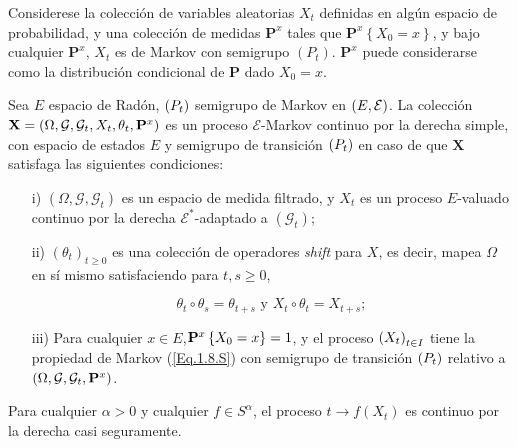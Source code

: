 Considerese la colecci\'on de variables aleatorias $X_{t}$ definidas en alg\'un espacio de probabilidad, y una colecci\'on de medidas $\mathbf{P}^{x}$ tales que $\mathbf{P}^{x}\left\{X_{0}=x\right\}$, y bajo cualquier $\mathbf{P}^{x}$, $X_{t}$ es de Markov con semigrupo $\left(P_{t}\right)$. $\mathbf{P}^{x}$ puede considerarse como la distribuci\'on condicional de $\mathbf{P}$ dado $X_{0}=x$.

\begin{Def}\label{Def.2.2.S}
Sea $E$ espacio de Rad\'on, $\left(P_{t}\right)$ semigrupo de Markov en $\left(E,\mathcal{E}\right)$. La colecci\'on $\mathbf{X}=\left(\Omega,\mathcal{G},\mathcal{G}_{t},X_{t},\theta_{t},\mathbf{P}^{x}\right)$ es un proceso $\mathcal{E}$-Markov continuo por la derecha simple, con espacio de estados $E$ y semigrupo de transici\'on $\left(P_{t}\right)$ en caso de que $\mathbf{X}$ satisfaga las siguientes condiciones:
\begin{itemize}
\item[i)] $\left(\Omega,\mathcal{G},\mathcal{G}_{t}\right)$ es un espacio de medida filtrado, y $X_{t}$ es un proceso $E$-valuado continuo por la derecha $\mathcal{E}^{*}$-adaptado a $\left(\mathcal{G}_{t}\right)$;

\item[ii)] $\left(\theta_{t}\right)_{t\geq0}$ es una colecci\'on de operadores {\em shift} para $X$, es decir, mapea $\Omega$ en s\'i mismo satisfaciendo para $t,s\geq0$,

\begin{equation}\label{Eq.Shift}
\theta_{t}\circ\theta_{s}=\theta_{t+s}\textrm{ y }X_{t}\circ\theta_{t}=X_{t+s};
\end{equation}

\item[iii)] Para cualquier $x\in E$,$\mathbf{P}^{x}\left\{X_{0}=x\right\}=1$, y el proceso $\left(X_{t}\right)_{t\in I}$ tiene la propiedad de Markov (\ref{Eq.1.8.S}) con semigrupo de transici\'on $\left(P_{t}\right)$ relativo a $\left(\Omega,\mathcal{G},\mathcal{G}_{t},\mathbf{P}^{x}\right)$.
\end{itemize}
\end{Def}

\begin{Def}[HD2]\label{Eq.2.2.S}
Para cualquier $\alpha>0$ y cualquier $f\in S^{\alpha}$, el proceso $t\rightarrow f\left(X_{t}\right)$ es continuo por la derecha casi seguramente.
\end{Def}

